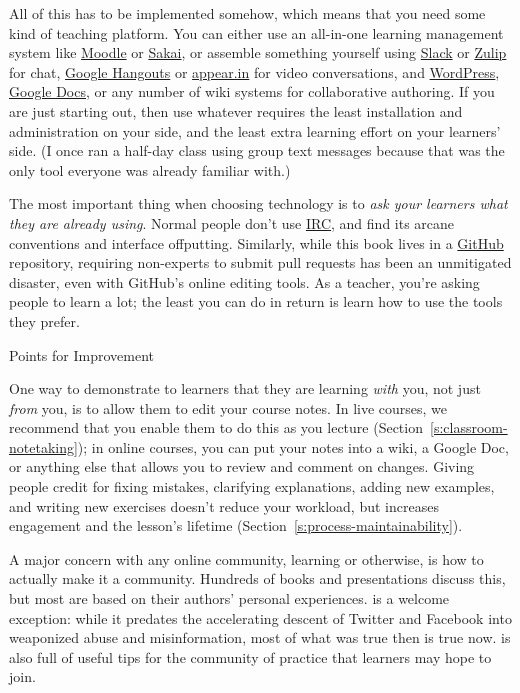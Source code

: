 All of this has to be implemented somehow, which means that you need
some kind of teaching platform. You can either use an all-in-one
learning management system like \href{http://moodle.org}{Moodle} or \href{https://www.sakaiproject.org/}{Sakai}, or
assemble something yourself using \href{http://slack.com}{Slack} or \href{https://zulipchat.com/}{Zulip} for
chat, \href{http://hangouts.google.com}{Google Hangouts} or \href{https://appear.in/}{appear.in} for
video conversations, and \href{https://wordpress.org/}{WordPress}, \href{http://docs.google.com}{Google
Docs}, or any number of wiki systems for collaborative
authoring. If you are just starting out, then use whatever requires
the least installation and administration on your side, and the least
extra learning effort on your learners' side. (I once ran a half-day
class using group text messages because that was the only tool
everyone was already familiar with.)

The most important thing when choosing technology is to \emph{ask your
learners what they are already using}. Normal people don't use
\href{https://en.wikipedia.org/wiki/Internet\_Relay\_Chat}{IRC}, and find its arcane conventions and interface
offputting. Similarly, while this book lives in a \href{http://github.com}{GitHub}
repository, requiring non-experts to submit pull requests has been an
unmitigated disaster, even with GitHub's online editing tools. As a
teacher, you're asking people to learn a lot; the least you can do in
return is learn how to use the tools they prefer.

\begin{aside}{Points for Improvement}

One way to demonstrate to learners that they are learning \emph{with} you,
not just \emph{from} you, is to allow them to edit your course notes. In
live courses, we recommend that you enable them to do this as you
lecture (Section~\ref{s:classroom-notetaking}); in online courses, you
can put your notes into a wiki, a Google Doc, or anything else that
allows you to review and comment on changes. Giving people credit for
fixing mistakes, clarifying explanations, adding new examples, and
writing new exercises doesn't reduce your workload, but increases
engagement and the lesson's lifetime
(Section~\ref{s:process-maintainability}).

\end{aside}

A major concern with any online community, learning or otherwise, is how
to actually make it a community. Hundreds of books and presentations
discuss this, but most are based on their authors' personal experiences.
\cite{Krau2016} is a welcome exception: while it predates the
accelerating descent of Twitter and Facebook into weaponized abuse and
misinformation, most of what was true then is true now.
\cite{Foge2005} is also full of useful tips for the community of
practice that learners may hope to join.

